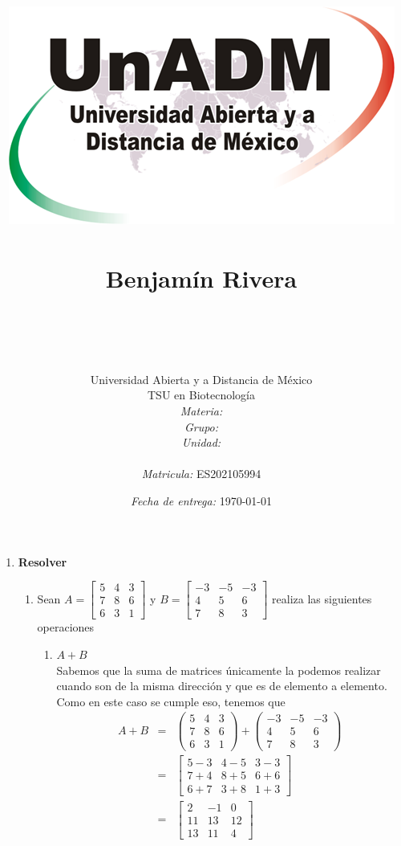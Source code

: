 \documentclass[12pt]{article}
\title{
	\includegraphics{../../../assets/logo-unadm} \\
	\ \\ Benjam\'in Rivera \\
	\bf{\titulo}\\\ \\}
\author{
	Universidad Abierta y a Distancia de México \\
	TSU en Biotecnolog\'ia \\
	\textit{Materia:} \materia \\
	\textit{Grupo:} \grupo \\
	\textit{Unidad:} \unidad \\
	\\
	\textit{Matricula:} ES202105994 }
\date{\textit{Fecha de entrega:} \today}
\begin{document}
\maketitle\newpage

\begin{enumerate}
	\item {\bf Resolver}
	\begin{enumerate}
		\item Sean 
		$A = \begin{bmatrix}
			5 & 4 & 3 \\
			7 & 8 & 6 \\
			6 & 3 & 1
		\end{bmatrix}$ y 
		$B = \begin{bmatrix}
			-3&-5 &-3 \\
			4 & 5 & 6 \\
			7 & 8 & 3
		\end{bmatrix}$  
		realiza las siguientes operaciones
		\begin{enumerate}
			\item $A+B$ \\ Sabemos que la suma de matrices \'unicamente la podemos realizar cuando son de la misma direcci\'on y que es de elemento a elemento. Como en este caso se cumple eso, tenemos que
				\begin{eqnarray*}
					A + B &=& 	\left(\begin{array}{rrr}
									5 & 4 & 3 \\
									7 & 8 & 6 \\
									6 & 3 & 1
								\end{array}\right) + 
								\left(\begin{array}{rrr}
									-3 & -5 & -3 \\
									4 & 5 & 6 \\
									7 & 8 & 3
								\end{array}\right) \\
					&=& \begin{bmatrix}
					 		5-3 & 4-5 & 3-3 \\
							7+4 & 8+5 & 6+6 \\
							6+7 & 3+8 & 1+3
						\end{bmatrix} \\
					&=& \begin{bmatrix}
							2 &-1 & 0 \\
							11&13 &12 \\
							13&11 &4
						\end{bmatrix}
				\end{eqnarray*}
			

\end{enumerate}
\end{enumerate}
\end{enumerate}
\end{document}
